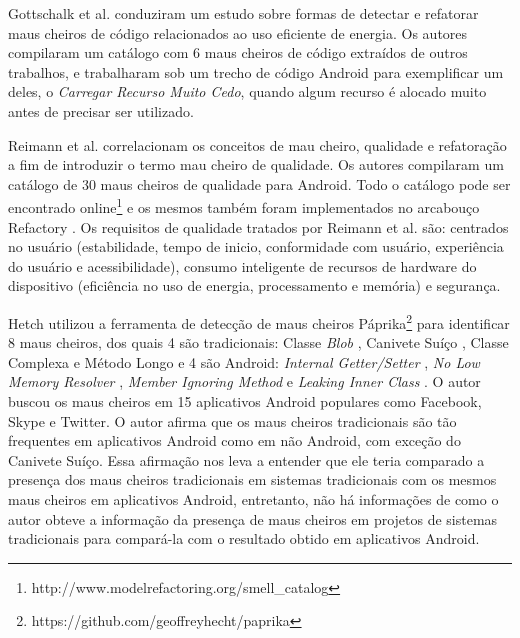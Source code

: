 Gottschalk et al. \cite{RemovingEnergySmells:12} conduziram um estudo sobre formas de detectar e refatorar maus cheiros de código relacionados ao uso eficiente de energia. Os autores compilaram um catálogo com 6 maus cheiros de código extraídos de outros trabalhos, e trabalharam sob um trecho de código Android para exemplificar um deles, o \textit{Carregar Recurso Muito Cedo}, quando algum recurso é alocado muito antes de precisar ser utilizado. 

Reimann et al. \cite{30QualitySmells:14} correlacionam os conceitos de mau cheiro, qualidade e refatoração a fim de introduzir o termo mau cheiro de qualidade. Os autores compilaram um catálogo de 30 maus cheiros de qualidade para Android. Todo o catálogo pode ser encontrado online\footnote{http://www.modelrefactoring.org/smell\_catalog} e os mesmos também foram implementados no arcabouço Refactory \cite{Reimann}. Os requisitos de qualidade tratados por Reimann et al. \cite{30QualitySmells:14} são: centrados no usuário (estabilidade, tempo de inicio, conformidade com usuário, experiência do usuário e acessibilidade), consumo inteligente de recursos de hardware do dispositivo (eficiência no uso de energia, processamento e memória) e segurança.

Hetch \cite{HetchDetectingAntipatternsAndroidApps:15} utilizou a ferramenta de detecção de maus cheiros Páprika\footnote{https://github.com/geoffreyhecht/paprika} para identificar 8 maus cheiros, dos quais 4 são tradicionais: Classe \textit{Blob} \cite{AntiPatterns:98}, Canivete Suíço \cite{AntiPatterns:98}, Classe Complexa \cite{Refactoring:99} e Método Longo \cite{Refactoring:99} e 4 são Android: \textit{Internal Getter/Setter} \cite{30QualitySmells:14}, \textit{No Low Memory Resolver} \cite{30QualitySmells:14}, \textit{Member Ignoring Method} \cite{30QualitySmells:14} e \textit{Leaking Inner Class} \cite{30QualitySmells:14}. O autor buscou os maus cheiros em 15 aplicativos Android populares como Facebook, Skype e Twitter. 
O autor afirma que os maus cheiros tradicionais são tão frequentes em aplicativos Android como em não Android, com exceção do Canivete Suíço. Essa afirmação nos leva a entender que ele teria comparado a presença dos maus cheiros tradicionais em sistemas tradicionais com os mesmos maus cheiros em aplicativos Android, entretanto, não há informações de como o autor obteve a informação da presença de maus cheiros em projetos de sistemas tradicionais para compará-la com o resultado obtido em aplicativos Android.
